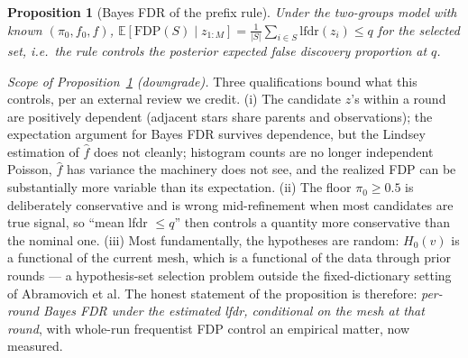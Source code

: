 \documentclass[11pt]{article}
\newtheorem{proposition}{Proposition}[section]
\newcommand{\E}{\mathbb{E}}
\newcommand{\lfdr}{\mathrm{lfdr}}
\begin{document}
\begin{proposition}[Bayes FDR of the prefix rule]\label{prop:fdr}
Under the two-groups model with known $(\pi_0,f_0,f)$,
$\E[\mathrm{FDP}(S)\mid z_{1:M}]=\frac{1}{|S|}\sum_{i\in S}\lfdr(z_i)\le q$ for the
selected set, i.e.\ the rule controls the posterior expected false discovery
proportion at $q$.
\end{proposition}

\emph{Scope of Proposition~\ref{prop:fdr} (downgrade).} Three qualifications
bound what this controls, per an external review we credit. (i) The candidate
$z$'s within a round are positively dependent (adjacent stars share parents
and observations); the expectation argument for Bayes FDR survives dependence,
but the Lindsey estimation of $\hat f$ does not cleanly; histogram counts
are no longer independent Poisson, $\hat f$ has variance the machinery does
not see, and the realized FDP can be substantially more variable than its
expectation. (ii) The floor $\pi_0\ge0.5$ is deliberately conservative and is
wrong mid-refinement when most candidates are true signal, so ``mean lfdr
$\le q$'' then controls a quantity more conservative than the nominal one.
(iii) Most fundamentally, the hypotheses are random: $H_0(v)$ is a functional
of the current mesh, which is a functional of the data through prior rounds
--- a hypothesis-set selection problem outside the fixed-dictionary setting of
Abramovich et al. The honest statement of the proposition is therefore:
\emph{per-round Bayes FDR under the estimated lfdr, conditional on the mesh at
that round}, with whole-run frequentist FDP control an empirical matter, now measured.
\end{document}
